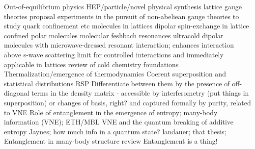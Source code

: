 Out-of-equilibrium physics
		\cite{eisert15}%
	HEP/particle/novel physical synthesis
		\cite{keilmann11}%
		lattice gauge theories
			proposal
				\cite{zohar16}%
			experiments
				\cite{schweizer19}%
		in the pursuit of non-abeliean gauge theories to study quark confinement etc
			\cite{tagliacozzo13}%
molecules in lattices
		\cite{yan13} dipolar spin-exchange in lattice confined polar molecules
		\cite{yang19} molecular feshbach resonances
		\cite{yan20} ultracold dipolar molecules with microwave-dressed resonant interaction; enhances interaction above s-wave scattering limit for controlled interactions and immediately applicable in lattices
		\cite{balakrishnan16} review of cold chemistry 
		\cite{yelin06, micheli06} %
foundations
	Thermalization/emergence of thermodynamics
		\cite{anderson58}%
		\cite{dalessio16}%
		\cite{goold16}%
		\cite{srednicki94}%
		\cite{clos16}%
		\cite{kaufman16}%
		Coerent superposition and statistical distributions RSP
			Differentiate between them by the presence of off-diagonal terms in the density matrix - accessible by interferometry (put things in superposition) or changes of basis, right? and captured formally by purity, related to VNE 
	Role of entanglement in the emergence of entropy; many-body information (VNE); ETH/MBL
		\cite{kaufman16}%
		\cite{nandkishore15}%
			VNE and the quantum breaking of additive entropy
		\cite{chiu18}%
Jaynes; how much info in a quantum state? landauer; that thesis; 
Entanglement in many-body structure
	\cite{amico08} review 
	Entanglement is a thing!%
